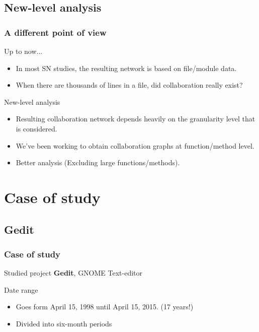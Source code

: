 \documentclass{beamer}
\begin{document}
\subsection{New-level analysis} %
\begin{frame}
\frametitle{A different point of view}
\begin{block}{Up to now...}
\begin{itemize}
\item In most SN studies, the resulting network is based on file/module data.
\item When there are thousands of lines in a file, did collaboration really exist?
\end{itemize}
\end{block}
\begin{block}{New-level analysis}
\begin{itemize}
\item Resulting collaboration network depends heavily on the granularity level that is considered.
\item We've been working to obtain collaboration graphs at function/method level.
\item Better analysis (Excluding large functions/methods).
\end{itemize}
\end{block}
\end{frame}

\section{Case of study}
\subsection{Gedit}
\begin{frame}
\frametitle{Case of study}
\begin{block}{Studied project}
\textbf{Gedit}, GNOME Text-editor
\end{block}
\begin{block}{Date range}
\begin{itemize}
\item Goes form April 15, 1998 until April 15, 2015. (17 years!)
\item Divided into six-month periods
\end{itemize}
\end{block}
\end{frame}
\end{document}
